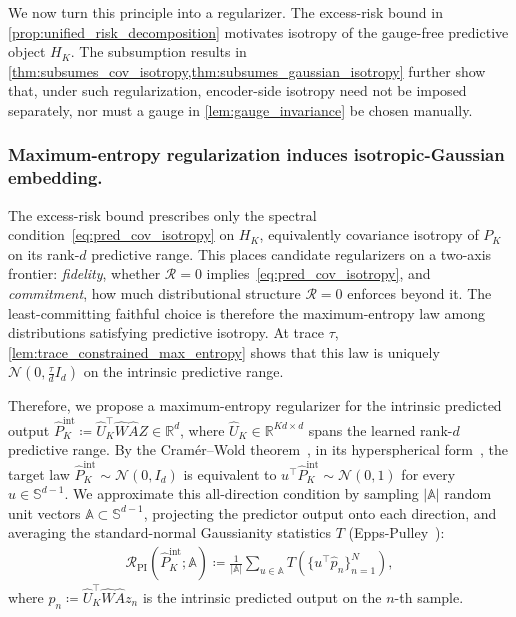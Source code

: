 
We now turn this principle into a regularizer.
The excess-risk bound in \cref{prop:unified_risk_decomposition}
motivates isotropy of the gauge-free predictive object $H_K$.
The subsumption results in
\cref{thm:subsumes_cov_isotropy,thm:subsumes_gaussian_isotropy} further show that, under such regularization, encoder-side isotropy need not be imposed separately, nor must a gauge in \cref{lem:gauge_invariance} be chosen manually.



\subsubsection{Maximum-entropy regularization induces isotropic-Gaussian embedding.}
\label{subsubsec:max_entropy_reg}
The excess-risk bound prescribes only the spectral condition~\eqref{eq:pred_cov_isotropy} on $H_K$, equivalently covariance isotropy of $P_K$ on its rank-$d$ predictive range.
This places candidate regularizers on a two-axis frontier: \emph{fidelity}, whether $\mathcal R = 0$ implies~\eqref{eq:pred_cov_isotropy}, and \emph{commitment}, how much distributional structure $\mathcal R = 0$ enforces beyond it.
The least-committing faithful choice is therefore the maximum-entropy law among distributions satisfying predictive isotropy.
At trace $\tau$, \cref{lem:trace_constrained_max_entropy} shows that this law is uniquely $\mathcal N(0,\tfrac{\tau}{d}I_d)$ on the intrinsic predictive range.


Therefore, we propose a maximum-entropy regularizer for the intrinsic
predicted output
$
    \widehat P_K^{\mathrm{int}}
    \coloneqq
    \widehat U_K^\top \widehat W\widehat A Z
    \in\mathbb R^d
$,
where $\widehat U_K\in\mathbb R^{Kd\times d}$ spans the learned rank-$d$
predictive range.
By the Cram\'er--Wold theorem~\citep{cramer1936some}, in its hyperspherical
form~\citep[Lemma~3]{balestriero2025lejepa}, the target law
$\widehat P_K^{\mathrm{int}}\sim\mathcal N(0,I_d)$ is equivalent to
$u^\top\widehat P_K^{\mathrm{int}}\sim\mathcal N(0,1)$ for every
$u\in\mathbb S^{d-1}$. We approximate this all-direction condition by
sampling $|\mathbb A|$ random unit vectors
$\mathbb A\subset\mathbb S^{d-1}$, projecting the predictor output onto
each direction, and averaging the standard-normal Gaussianity statistics
$T$ (Epps-Pulley~\citep{epps1983test}):
\begin{align}
\label{eq:predictive_isotropy_regularizer}
    \mathcal R_{\mathrm{PI}}(\widehat P_K^{\mathrm{int}};\mathbb A)
    \coloneqq
    \frac{1}{|\mathbb A|}
    \sum_{u\in\mathbb A}
    T\!\left(\{u^\top \widehat p_n\}_{n=1}^N\right),
\end{align}
where
$\widehat p_n \coloneqq \widehat U_K^\top \widehat W\widehat A z_n$ is the intrinsic predicted output on the $n$-th sample.

